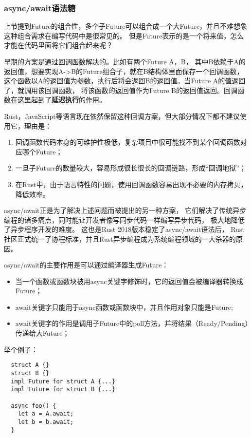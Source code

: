 \documentclass[supercite]{HustGraduPaper}
\theoremstyle{definition}
\begin{document}
\subsubsection{async/await语法糖}
上节提到Future的组合性，多个子Future可以组合成一个大Future，并且不难想象这种组合需求在编写代码中是很常见的。
但是Future表示的是一个将来值，怎么才能在代码里面将它们组合起来呢？\par

早期的方案是通过回调函数解决的。比如有两个Future A，B，
其中B依赖于A的返回值，想要实现A->B的Future组合子，就在B结构体里面保存一个回调函数，
这个函数以A的返回值为参数，执行后将会返回B的返回值。当Future A的值返回了，就调用该回调函数，
将该函数的返回值作为Future B的返回值返回。回调函数在这里起到了\textbf{延迟执行}的作用。\par

Rust，JavaScript等语言现在依然保留这种回调方案，但大部分情况下都不建议使用它，理由是：
\begin{enumerate}
  \item 回调函数代码本身的可维护性极低，复杂项目中很可能找不到某个回调函数对应哪个Future；
  \item 一旦子Future的数量较大，容易形成很长很长的回调链路，形成“回调地狱”；
  \item 在Rust中，由于语言特性的问题，使用回调函数容易出现不必要的内存拷贝，降低效率。
\end{enumerate}

async/await正是为了解决上述问题而被提出的另一种方案，
它们解决了传统异步编程的诸多痛点，同时能让开发者像写同步代码一样编写异步代码，
极大地降低了异步程序开发的难度。
这也是Rust 2018版本稳定了async/await语法后，
Rust社区正式统一了协程标准，并且Rust异步编程成为系统编程领域的一大杀器的原因。

async/await的主要作用是可以通过编译器生成Future：
\begin{itemize}
  \item 当一个函数或函数块被用async关键字修饰时，它的返回值会被编译器转换成Future；
  \item await关键字只能用于async函数或函数块中，并且作用对象只能是Future;
  \item await关键字的作用是调用子Future中的poll方法，并将结果（Ready/Pending）传递给大Future；
\end{itemize}

举个例子：
\begin{lstlisting}
  struct A {}
  struct B {}
  impl Future for struct A {...}
  impl Future for struct B {...}

  async foo() {
    let a = A.await;
    let b = b.await;
  }
\end{lstlisting}
\end{document}
